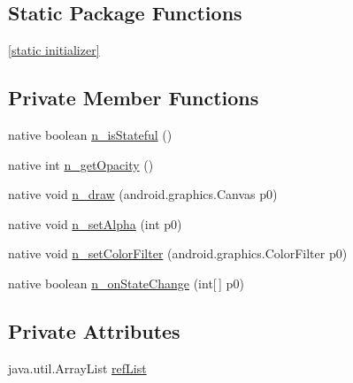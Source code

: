 \subsection*{Static Package Functions}
\begin{CompactItemize}
\item 
\hyperlink{classmd5b60ffeb829f638581ab2bb9b1a7f4f3f_1_1_button_drawable_997a240c130ec2aeda640089ab2e2f26}{\mbox{[}static initializer\mbox{]}}
\end{CompactItemize}
\subsection*{Private Member Functions}
\begin{CompactItemize}
\item 
native boolean \hyperlink{classmd5b60ffeb829f638581ab2bb9b1a7f4f3f_1_1_button_drawable_36e2ba04f406e9f47a35fa82da0c994e}{n\_\-isStateful} ()
\item 
native int \hyperlink{classmd5b60ffeb829f638581ab2bb9b1a7f4f3f_1_1_button_drawable_68a3c7ed19890b9d504b2c8fd1d7a9ac}{n\_\-getOpacity} ()
\item 
native void \hyperlink{classmd5b60ffeb829f638581ab2bb9b1a7f4f3f_1_1_button_drawable_7f82f0049266f99a0ba16b61059e7807}{n\_\-draw} (android.graphics.Canvas p0)
\item 
native void \hyperlink{classmd5b60ffeb829f638581ab2bb9b1a7f4f3f_1_1_button_drawable_b6c0d6640b641ff7d1e790113c1aee90}{n\_\-setAlpha} (int p0)
\item 
native void \hyperlink{classmd5b60ffeb829f638581ab2bb9b1a7f4f3f_1_1_button_drawable_611d0f00b4f853446cfaccf8130ac3ab}{n\_\-setColorFilter} (android.graphics.ColorFilter p0)
\item 
native boolean \hyperlink{classmd5b60ffeb829f638581ab2bb9b1a7f4f3f_1_1_button_drawable_10ce7ebc986090cf1498d873b3bff7e4}{n\_\-onStateChange} (int\mbox{[}$\,$\mbox{]} p0)
\end{CompactItemize}
\subsection*{Private Attributes}
\begin{CompactItemize}
\item 
java.util.ArrayList \hyperlink{classmd5b60ffeb829f638581ab2bb9b1a7f4f3f_1_1_button_drawable_e370a961054bb1dae39a194afc0f2751}{refList}
\end{CompactItemize}


